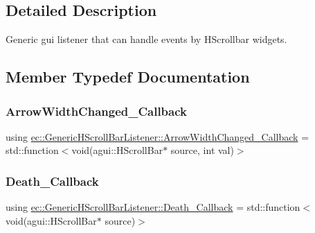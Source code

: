 \subsection{Detailed Description}
Generic gui listener that can handle events by H\+Scrollbar widgets. 

\subsection{Member Typedef Documentation}
\mbox{\label{classec_1_1_generic_h_scroll_bar_listener_a5f6e07b1012f51b6ef9be3d9ac81e121}} 
\subsubsection{\texorpdfstring{Arrow\+Width\+Changed\+\_\+\+Callback}{ArrowWidthChanged\_Callback}}
{\footnotesize\ttfamily using \mbox{\hyperlink{classec_1_1_generic_h_scroll_bar_listener_a5f6e07b1012f51b6ef9be3d9ac81e121}{ec\+::\+Generic\+H\+Scroll\+Bar\+Listener\+::\+Arrow\+Width\+Changed\+\_\+\+Callback}} =  std\+::function$<$void(agui\+::\+H\+Scroll\+Bar$\ast$ source, int val)$>$}

\mbox{\label{classec_1_1_generic_h_scroll_bar_listener_a20ad93a508cb41b9bd1f2de9f470d617}} 
\subsubsection{\texorpdfstring{Death\+\_\+\+Callback}{Death\_Callback}}
{\footnotesize\ttfamily using \mbox{\hyperlink{classec_1_1_generic_h_scroll_bar_listener_a20ad93a508cb41b9bd1f2de9f470d617}{ec\+::\+Generic\+H\+Scroll\+Bar\+Listener\+::\+Death\+\_\+\+Callback}} =  std\+::function$<$void(agui\+::\+H\+Scroll\+Bar$\ast$ source)$>$}


